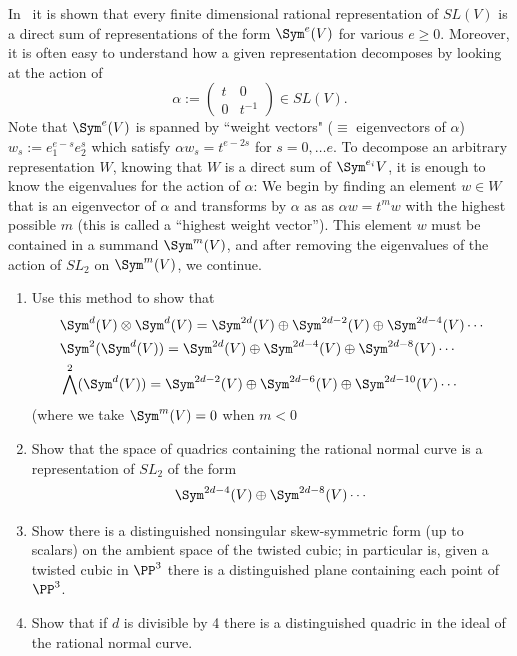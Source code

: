 \begin{exercise}
In~\cite[pp. 146--150]{Fulton-Harris} it is shown that
 every finite dimensional rational 
representation of $SL(V)$ is a direct sum of representations of the form $\Sym^e(V)$ for various $e\geq 0$. Moreover, it is often easy to understand
how a given representation decomposes by looking at the action of
$$
\alpha := \begin{pmatrix}
t&0\\
0&t^{-1}
\end{pmatrix}
\in SL(V).
$$
Note that $\Sym^e(V)$ is spanned by ``weight vectors" ($\equiv$ eigenvectors of $\alpha$) $w_s := e_1^{e-s} e_2^{s}$ 
which satisfy $\alpha w_s = t^{e-2s}$ for $s = 0, \dots e$.
To decompose an arbitrary representation $W$, knowing that $W$ is a direct sum of $\Sym^{e_i}V$, it is enough to know the 
eigenvalues for the action of $\alpha$: We begin by finding an element $w\in W$ that
is an eigenvector of $\alpha$ and transforms by $\alpha$ as
as $\alpha w = t^mw$ with the highest possible $m$ (this is called a ``highest weight vector''). This element $w$ must be contained
in a summand $\Sym^m(V)$, and after removing the eigenvalues of the action of $SL_2$ on $\Sym^m(V)$, we continue. 
\begin{enumerate}
 \item Use this method to show that 
\begin{align*}
&\Sym^d(V)\otimes \Sym^d(V)= \Sym^{2d}(V) \oplus  \Sym^{2d-2}(V) \oplus \Sym^{2d-4}(V) \cdots\\
 &\Sym^2(\Sym^d(V))= \Sym^{2d}(V) \oplus \Sym^{2d-4}(V)\oplus \Sym^{2d-8}(V) \cdots\\
 &\bigwedge^2(\Sym^d(V))= \Sym^{2d-2}(V) \oplus \Sym^{2d-6}(V)\oplus \Sym^{2d-10}(V) \cdots
\end{align*}
  (where we take $\Sym^{m}(V)=0$ when $m<0$
 \item Show that the space of quadrics containing the rational normal curve is a representation of $SL_2$ of the form
 $$
 \Sym^{2d-4}(V)\oplus \Sym^{2d-8}(V) \cdots
 $$
  \item Show  there is a distinguished nonsingular skew-symmetric form (up to scalars) on the ambient space of the twisted cubic; in particular
  is, given a twisted cubic in $\PP^3$ there is a distinguished plane containing each point of $\PP^3$.
 \item Show that if $d$ is divisible by 4 there is a distinguished quadric in the ideal of the rational normal curve.
\end{enumerate}
\end{exercise}

